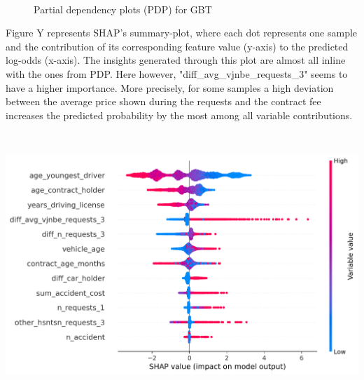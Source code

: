 \documentclass[12pt,titlepage]{article}
\begin{document}
\begin{figure}
\begin{subfigure}{.55\textwidth}
    \end{subfigure} \\
\caption{Partial dependency plots (PDP) for GBT}
\label{fig:pdp}
\end{figure}

Figure Y represents SHAP's summary-plot, where each dot represents one sample and the contribution of its corresponding feature value (y-axis) to the predicted log-odds (x-axis). The insights generated through this plot are almost all inline with the ones from PDP. Here however, "diff\_avg\_vjnbe\_requests\_3" seems to have a higher importance. More precisely, for some samples a high deviation between the average price shown during the requests and the contract fee increases the predicted probability by the most among all variable contributions. \\
\centerline{\includegraphics[height=10cm]{shap_summary.png}}
\end{document}
